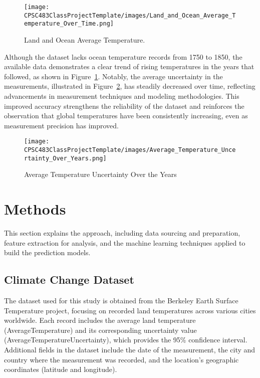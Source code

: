 \documentclass[conference]{IEEEtran}
\begin{document}
\begin{figure}[htbp]
\centering
\texttt{[image: CPSC483ClassProjectTemplate/images/Land\_and\_Ocean\_Average\_Temperature\_Over\_Time.png]}
\caption{Land and Ocean Average Temperature.}
\label{fig:temperature_plot}
\end{figure}

Although the dataset lacks ocean temperature records from 1750 to 1850, the available data demonstrates a clear trend of rising temperatures in the years that followed, as shown in Figure~\ref{fig:temperature_plot}. Notably, the average uncertainty in the measurements, illustrated in Figure~\ref{fig:temperature_uncertainty_plot}, has steadily decreased over time, reflecting advancements in measurement techniques and modeling methodologies. This improved accuracy strengthens the reliability of the dataset and reinforces the observation that global temperatures have been consistently increasing, even as measurement precision has improved.

\begin{figure}[htbp]
\centering
\texttt{[image: CPSC483ClassProjectTemplate/images/Average\_Temperature\_Uncertainty\_Over\_Years.png]}
\caption{Average Temperature Uncertainty Over the Years}
\label{fig:temperature_uncertainty_plot}
\end{figure}

\section{Methods}

This section explains the approach, including data sourcing and preparation, feature extraction for analysis, and the machine learning techniques applied to build the prediction models.

\subsection{Climate Change Dataset}
The dataset used for this study is obtained from the Berkeley Earth Surface Temperature project, focusing on recorded land temperatures across various cities worldwide. Each record includes the average land temperature (AverageTemperature) and its corresponding uncertainty value (AverageTemperatureUncertainty), which provides the 95\% confidence interval\cite{b6}\cite{b7}. Additional fields in the dataset include the date of the measurement, the city and country where the measurement was recorded, and the location's geographic coordinates (latitude and longitude).
\end{document}
